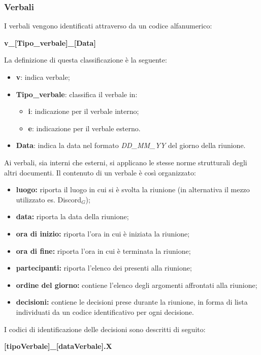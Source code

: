 \subsubsection{Verbali}\label{ProcessiDiSupportoDocumentazioneStrutturaGeneraleDeiDocumentiVerbali}
I verbali vengono identificati attraverso da un codice alfanumerico:
\begin{center}
	\textbf{v\_[Tipo\_verbale]\_[Data]}
\end{center}
La definizione di questa classificazione è la seguente:
\begin{itemize}
	\item \textbf{v}: indica verbale;
	\item \textbf{Tipo\_verbale}: classifica il verbale in:
		\begin{itemize}
			\item \textbf{i}: indicazione per il verbale interno;
			\item \textbf{e}: indicazione per il verbale esterno.
		\end{itemize}
	\item \textbf{Data}: indica la data nel formato \textit{DD\_MM\_YY} del giorno della riunione.
\end{itemize}
Ai verbali, sia interni che esterni, si applicano le stesse norme strutturali degli altri documenti. Il contenuto di un verbale è così organizzato:
\begin{itemize}
\item \textbf{luogo:} riporta il luogo in cui si è svolta la riunione (in alternativa il mezzo utilizzato es. Discord$_G$);
	\item \textbf{data:} riporta la data della riunione;
		\item \textbf{ora di inizio:} riporta l'ora in cui è iniziata la riunione;
			\item \textbf{ora di fine:} riporta l'ora in cui è terminata la riunione;
				\item \textbf{partecipanti:} riporta l'elenco dei presenti alla riunione;
					\item \textbf{ordine del giorno:} contiene l'elenco degli argomenti affrontati alla riunione;
						\item \textbf{decisioni:}  contiene le decisioni prese durante la riunione, in forma di lista individuati da un codice identificativo per ogni decisione.
\end{itemize}
I codici di identificazione delle decisioni sono descritti di seguito:
\begin{center}
	\textbf{[tipoVerbale]\_[dataVerbale].X}
\end{center}
